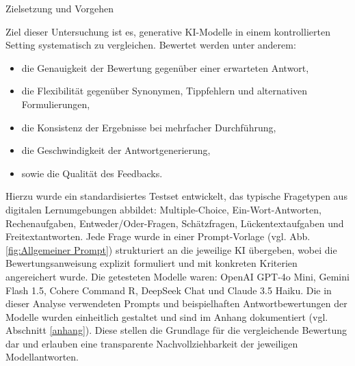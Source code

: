 \documentclass[a4paper,12pt]{article}
\begin{document}
Zielsetzung und Vorgehen

Ziel dieser Untersuchung ist es, generative KI-Modelle in einem kontrollierten Setting systematisch zu vergleichen. Bewertet werden unter anderem:

\begin{itemize}
  \item die Genauigkeit der Bewertung gegenüber einer erwarteten Antwort,
  \item die Flexibilität gegenüber Synonymen, Tippfehlern und alternativen Formulierungen,
  \item die Konsistenz der Ergebnisse bei mehrfacher Durchführung,
  \item die Geschwindigkeit der Antwortgenerierung,
  \item sowie die Qualität des Feedbacks.
\end{itemize}

Hierzu wurde ein standardisiertes Testset entwickelt, das typische Fragetypen aus digitalen Lernumgebungen abbildet: Multiple-Choice, Ein-Wort-Antworten, Rechenaufgaben, Entweder/Oder-Fragen, Schätzfragen, Lückentextaufgaben und Freitextantworten. Jede Frage wurde in einer Prompt-Vorlage (vgl. Abb. \ref{fig:Allgemeiner Prompt}) strukturiert an die jeweilige KI übergeben, wobei die Bewertungsanweisung explizit formuliert und mit konkreten Kriterien angereichert wurde. Die getesteten Modelle waren: OpenAI GPT-4o Mini, Gemini Flash 1.5, Cohere Command R, DeepSeek Chat und Claude 3.5 Haiku.
Die in dieser Analyse verwendeten Prompts und beispielhaften Antwortbewertungen der Modelle wurden einheitlich gestaltet und sind im Anhang dokumentiert (vgl. Abschnitt \ref{anhang}). Diese stellen die Grundlage für die vergleichende Bewertung dar und erlauben eine transparente Nachvollziehbarkeit der jeweiligen Modellantworten.

\newpage
\end{document}
